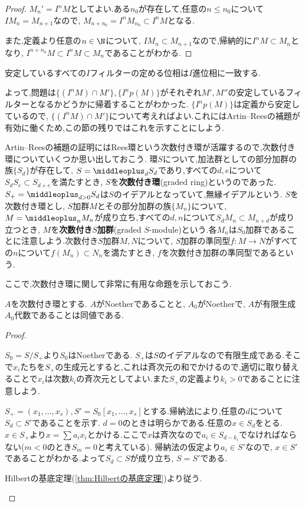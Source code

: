 \begin{proof}
	$M_n'=I^nM$としてよい.ある$n_0$が存在して,任意の$n\leq n_0$について$IM_n=M_{n+1}$なので, $M_{n+n_0}=I^nM_{n_0}\subset I^nM$となる.
	
	また,定義より任意の$n\in\N$について, $IM_n\subset M_{n+1}$なので,帰納的に$I^nM\subset M_n$となり, $I^{n+n_0}M\subset I^nM\subset M_n$であることがわかる.
\end{proof}

\begin{cor}
	安定しているすべての$I$フィルターの定める位相は$I$進位相に一致する.
\end{cor}

よって,問題は$\{(I^nM)\cap M'\},\{I^n p(M)\}$がそれぞれ$M',M''$の安定しているフィルターとなるかどうかに帰着することがわかった. $\{I^n p(M)\}$は定義から安定しているので, $\{(I^nM)\cap M'\}$について考えればよい.これにはArtin--Reesの補題が有効に働くため,この節の残りではこれを示すことにしよう.

Artin--Reesの補題の証明にはRees環という次数付き環が活躍するので,次数付き環についていくつか思い出しておこう. 環$S$について,加法群としての部分加群の族$\{S_d\}$が存在して, $S=\middleoplus_d S_d$であり,すべての$d,e$について$S_dS_e\subset S_{d+e}$を満たすとき, $S$を\textbf{次数付き環}(graded ring)というのであった. $S_+=\middleoplus_{d>0}S_d$は$S$のイデアルとなっていて,無縁イデアルという. $S$を次数付き環とし, $S$加群$M$とその部分加群の族$\{M_n\}$について, $M=\middleoplus_n M_n$が成り立ち,すべての$d,n$について$S_dM_n\subset M_{n+d}$が成り立つとき, $M$を\textbf{次数付き}$S$\textbf{加群}(graded $S$-module)という.各$M_n$は$S_0$加群であることに注意しよう.次数付き$S$加群$M,N$について, $S$加群の準同型$f:M\to N$がすべての$n$について$f(M_n)\subset N_n$を満たすとき, $f$を次数付き加群の準同型であるという.

ここで,次数付き環に関して非常に有用な命題を示しておこう.

\begin{prop}\label{prop:次数付き環のNoether性}
	$A$を次数付き環とする. $A$がNoetherであることと, $A_0$がNoetherで, $A$が有限生成$A_0$代数であることは同値である.
\end{prop}

\begin{proof}
	\begin{eqv}
		\item $S_0=S/S_+$より$S_0$はNoetherである. $S_+$は$S$のイデアルなので有限生成である.そこで$x_i$たちを$S_+$の生成元とすると,これは斉次元の和でかけるので,適切に取り替えることで$x_i$は次数$k_i$の斉次元としてよい.また$S_+$の定義より$k_i>0$であることに注意しよう.
		
		$S_+=(x_1,\dots,x_s), S'=S_0[x_1,\dots,x_s]$とする.帰納法により,任意の$d$について$S_d\subset S'$であることを示す. $d=0$のときは明らかである.任意の$x\in S_d$をとる. $x\in S_+$より$x=\sum a_ix_i$とかける.ここで$x$は斉次なので$a_i\in S_{d-k_i}$でなければならない($m<0$のとき$S_m=0$と考えている). 帰納法の仮定より$a_i\in S'$なので, $x\in S'$であることがわかる.よって$S_d\subset S$が成り立ち, $S=S'$である.
		
		\item Hilbertの基底定理(\ref{thm:Hilbertの基底定理})より従う.
	\end{eqv}
\end{proof}

